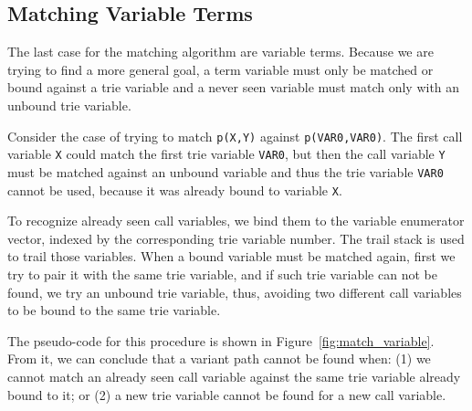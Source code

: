 \subsection{Matching Variable Terms}

The last case for the matching algorithm are variable terms. Because we are trying to find a more general goal,
a term variable must only be matched or bound against a trie variable and a
never seen variable must match only with an unbound trie variable.

Consider the case of trying to match \texttt{p(X,Y)} against \texttt{p(VAR0,VAR0)}.
The first call variable \texttt{X} could match the first trie variable \texttt{VAR0},
but then the call variable \texttt{Y} must be matched against an unbound variable and
thus the trie variable \texttt{VAR0} cannot be used, because it
was already bound to variable \texttt{X}.

To recognize already seen call variables, we bind them to the variable enumerator vector, indexed
by the corresponding trie variable number. The trail stack is used to trail those variables.
When a bound variable must be matched again, first we try to pair it with the same trie variable,
and if such trie variable can not be found, we try an unbound trie variable, thus,
avoiding two different call variables to be bound to the same trie variable.

The pseudo-code for this procedure is shown in Figure~\ref{fig:match_variable}.
From it, we can conclude that a variant path
cannot be found when:
(1) we cannot match an already seen call variable against the same trie variable already bound to it;
or (2) a new trie variable cannot be found for a new call variable.

